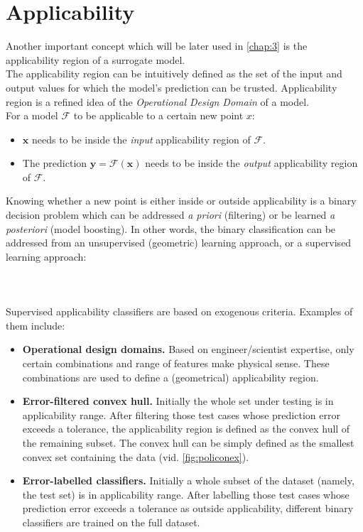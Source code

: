 \section{Applicability}
Another important concept which will be later used in \autoref{chap:3} is the applicability region of a surrogate model.\\
\indent The applicability region can be intuitively defined as the set of the input and output values for which the model's prediction can be trusted. Applicability region is a refined idea of the \textit{Operational Design Domain} of a model.\\
\indent For a model $\mathcal{F}$ to be applicable to a certain new point $x$:
\begin{itemize}
	\item $\mathbf{x}$ needs to be inside the \textit{input} applicability region of $\mathcal{F}$.
	\item The prediction $\mathbf{y}=\mathcal{F}(\mathbf{x})$ needs to be inside the \textit{output} applicability region of $\mathcal{F}$.\\
\end{itemize}
%
\indent Knowing whether a new point is either inside or outside applicability is a binary decision problem which can be addressed \textit{a priori} (filtering) or be learned \textit{a posteriori} (model boosting). In other words, the binary classification can be addressed from an unsupervised (geometric) learning approach, or a supervised learning approach:
\paragraph{ \\}
Supervised applicability classifiers are based on exogenous criteria. Examples of them include:
\begin{itemize}
	\item \textbf{Operational design domains.} Based on engineer/scientist expertise, only certain combinations and range of features make physical sense. These combinations are used to define a (geometrical) applicability region.
	\item \textbf{Error-filtered convex hull.} Initially the whole set under testing is in applicability range. After filtering those test cases whose prediction error exceeds a tolerance, the applicability region is defined as the convex hull of the remaining subset. The convex hull can be simply defined as the smallest convex set containing the data\cite{Preparata1985} (vid. \cref{fig:policonex}).
	\item \textbf{Error-labelled classifiers.} Initially a whole subset of the dataset (namely, the test set) is in applicability range. After labelling those test cases whose prediction error exceeds a tolerance as outside applicability, different binary classifiers are trained on the full dataset.\\
\end{itemize}

